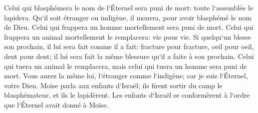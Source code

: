 \verse Celui qui blasphémera le nom de l`Éternel sera puni de mort: toute l`assemblée le lapidera. Qu`il soit étranger ou indigène, il mourra, pour avoir blasphémé le nom de Dieu. 
\verse Celui qui frappera un homme mortellement sera puni de mort. 
\verse Celui qui frappera un animal mortellement le remplacera: vie pour vie. 
\verse Si quelqu`un blesse son prochain, il lui sera fait comme il a fait: 
\verse fracture pour fracture, oeil pour oeil, dent pour dent; il lui sera fait la même blessure qu`il a faite à son prochain. 
\verse Celui qui tuera un animal le remplacera, mais celui qui tuera un homme sera puni de mort. 
\verse Vous aurez la même loi, l`étranger comme l`indigène; car je suis l`Éternel, votre Dieu. 
\verse Moïse parla aux enfants d`Israël; ils firent sortir du camp le blasphémateur, et ils le lapidèrent. Les enfants d`Israël se conformèrent à l`ordre que l`Éternel avait donné à Moïse. 

